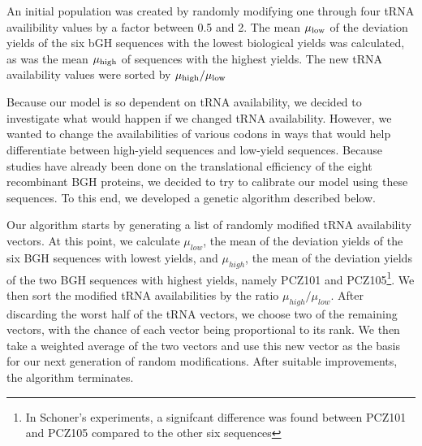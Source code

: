 \documentclass[12pt, draft]{article}
\numberwithin{equation}{section}
\begin{document}
An initial population was created by randomly modifying one through four tRNA availibility values by a factor between 0.5 and 2.
The mean $\mu_{\rm{low}}$ of the deviation yields of the six bGH sequences with the lowest biological yields was calculated,
as was the mean $\mu_{\rm{high}}$ of sequences with the highest yields.
The new tRNA availability values were sorted by $\mu_{\rm{high}}/\mu_{\rm{low}}$

Because our model is so dependent on tRNA availability, we decided to investigate what would happen if we changed tRNA availability.  
However, we wanted to change the availabilities of various codons in ways that would help differentiate between high-yield sequences and low-yield sequences.  
Because studies have already been done on the translational efficiency of the eight recombinant BGH proteins, we decided to try to calibrate our model using these sequences.  To this end, we developed a genetic algorithm described below.

Our algorithm starts by generating a list of randomly modified tRNA availability vectors.  
At this point, we calculate $\mu_{low}$, the mean of the deviation yields of the six BGH sequences with lowest yields, 
and $\mu_{high}$, the mean of the deviation yields of the two BGH sequences with highest yields, namely PCZ101 and 
PCZ105\footnote{In Schoner's experiments, a signifcant difference was found between PCZ101 and PCZ105 compared to the other six sequences}.  
We then sort the modified tRNA availabilities by the ratio $\mu_{high}/\mu_{low}$.  
After discarding the worst half of the tRNA vectors, we choose two of the remaining vectors, with the chance of each vector being proportional to its rank.  
We then take a weighted average of the two vectors and use this new vector as the basis for our next generation of random modifications.  
After suitable improvements, the algorithm terminates.

\begin{singlespace}
  
\end{singlespace}
\end{document}
